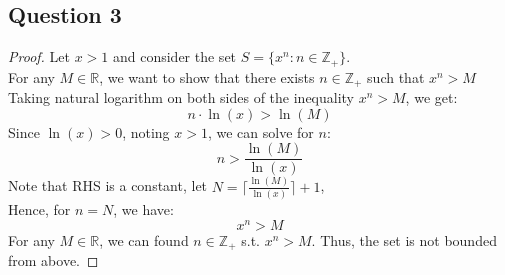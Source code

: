 \documentclass{article}
\begin{document}
\subsection*{Question 3}

\begin{proof}
    Let $x > 1$ and consider the set $S = \{ x^n : n \in \mathbb{Z}_{+} \}$.
    \\
    For any $M \in \mathbb{R}$, we want to show that there exists $n \in \mathbb{Z}_{+}$ such that $x^n > M$
    \\
    Taking natural logarithm on both sides of the inequality $x^n > M$, we get:
    \[ n \cdot \ln(x) > \ln(M) \]
    Since $\ln(x) > 0$, noting $x > 1$, we can solve for $n$:
    \[ n > \frac{\ln(M)}{\ln(x)} \]
    Note that RHS is a constant, let $N = \lceil \frac{\ln(M)}{\ln(x)} \rceil + 1$,
    \\
    Hence, for $n = N$, we have:
    \[ x^n > M \]
    For any $M \in \mathbb{R}$, we can found $n \in \mathbb{Z}_{+}$ s.t. $x^n > M$. Thus, the set is not bounded from above.
\end{proof}
\end{document}
